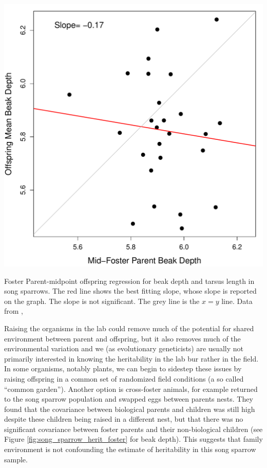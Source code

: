  \begin{marginfigure}
\begin{center}
\includegraphics[width=\textwidth]{Journal_figs/Quant_gen/song_sparrow_herit/song_sparrow_herit_foster.pdf}
\end{center}
\caption{Foster Parent-midpoint offspring regression for beak depth and
  tarsus length in song sparrows. The red line shows the best fitting
  slope, whose slope is reported on the graph. The slope is not significant. The grey line is the
  $x=y$ line. Data from \citet{smith1980experimental},
  } \label{fig:song_sparrow_herit_foster}
\end{marginfigure}

Raising the organisms in the lab could remove much of the potential for shared
environment between parent and offspring, but it also removes much of the
environmental variation and we (as evolutionary geneticists) are usually not primarily interested in knowing
the heritability in the lab bur rather in the field. In some organisms,
notably plants, we can begin to sidestep these issues by raising offspring
in a common set of randomized field conditions (a so called ``common
garden''). Another option is cross-foster animals, for example
\citet{smith1980experimental} returned to the song sparrow population
and swapped eggs between parents nests. They found that the covariance
between biological parents and children was still high despite these
children being raised in a different nest, but that there was no significant
covariance between foster parents and their non-biological children
(see Figure \ref{fig:song_sparrow_herit_foster} for beak depth). This suggests that
family environment is not confounding the estimate of heritability in
this song sparrow sample.

